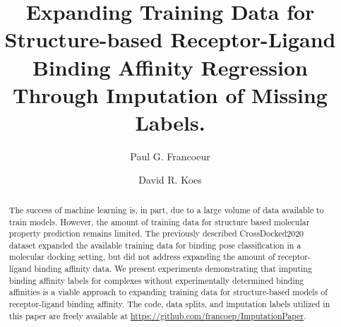 \documentclass[journal=jmcmar,manuscript=article]{achemso}
\author{Paul G. Francoeur}
\author{David R. Koes}
\affiliation[Pitt]{Department of Computational and Systems Biology, University of Pittsburgh, Pittsburgh, PA 15260}
\title[Imputation for Binding Affinity Regression]{Expanding Training Data for Structure-based Receptor-Ligand Binding Affinity Regression Through Imputation of Missing Labels.}
\begin{document}
\begin{tocentry}




\end{tocentry}

\begin{abstract}
The success of machine learning is, in part, due to a large volume of data available to train models.
However, the amount of training data for structure based molecular property prediction remains limited.
The previously described CrossDocked2020 dataset expanded the available training data for binding pose classification in a molecular docking setting, but did not address expanding the amount of receptor-ligand binding affinity data.
We present experiments demonstrating that imputing binding affinity labels for complexes without experimentally determined binding affinities is a viable approach to expanding training data for structure-based models of receptor-ligand binding affinity.
The code, data splits, and imputation labels utilized in this paper are freely available at \url{https://github.com/francoep/ImputationPaper}.
\end{abstract}
\end{document}
